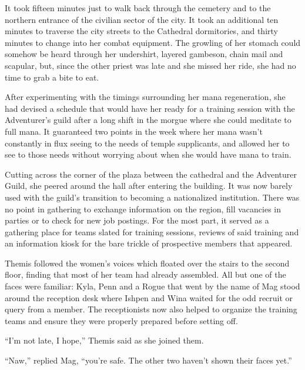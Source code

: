  

It took fifteen minutes just to walk back through the cemetery and to the northern entrance of the civilian sector of the city. It took an additional ten minutes to traverse the city streets to the Cathedral dormitories, and thirty minutes to change into her combat equipment. The growling of her stomach could somehow be heard through her undershirt, layered gambeson, chain mail and scapular, but, since the other priest was late and she missed her ride, she had no time to grab a bite to eat.

 

After experimenting with the timings surrounding her mana regeneration, she had devised a schedule that would have her ready for a training session with the Adventurer’s guild after a long shift in the morgue where she could meditate to full mana. It guaranteed two points in the week where her mana wasn’t constantly in flux seeing to the needs of temple supplicants, and allowed her to see to those needs without worrying about when she would have mana to train.

 

Cutting across the corner of the plaza between the cathedral and the Adventurer Guild, she peered around the hall after entering the building. It was now barely used with the guild’s transition to becoming a nationalized institution. There was no point in gathering to exchange information on the region, fill vacancies in parties or to check for new job postings. For the most part, it served as a gathering place for teams slated for training sessions, reviews of said training and an information kiosk for the bare trickle of prospective members that appeared.

 

Themis followed the women’s voices which floated over the stairs to the second floor, finding that most of her team had already assembled. All but one of the faces were familiar: Kyla, Penn and a Rogue that went by the name of Mag stood around the reception desk where Ishpen and Wina waited for the odd recruit or query from a member. The receptionists now also helped to organize the training teams and ensure they were properly prepared before setting off.

 

“I’m not late, I hope,” Themis said as she joined them.

 

“Naw,” replied Mag, “you’re safe. The other two haven’t shown their faces yet.”

